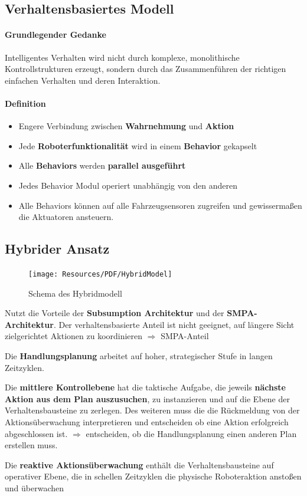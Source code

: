 \subsection{Verhaltensbasiertes Modell}
\paragraph{Grundlegender Gedanke} Intelligentes Verhalten wird nicht durch
komplexe, monolithische Kontrollstrukturen erzeugt, sondern durch das
Zusammenführen der richtigen einfachen Verhalten und deren Interaktion.

\paragraph{Definition}
\begin{itemize}
	\item Engere Verbindung zwischen \textbf{Wahrnehmung} und \textbf{Aktion}
	\item Jede \textbf{Roboterfunktionalität} wird in einem \textbf{Behavior}
		gekapselt
	\item Alle \textbf{Behaviors} werden \textbf{parallel ausgeführt}
	\item Jedes Behavior Modul operiert unabhängig von den anderen
	\item Alle Behaviors können auf alle Fahrzeugsensoren zugreifen und
		gewissermaßen die Aktuatoren ansteuern.
\end{itemize}

\subsection{Hybrider Ansatz}
{
\begin{figure}
	\texttt{[image: Resources/PDF/HybridModel]}
	\caption{Schema des Hybridmodell}
\end{figure}

Nutzt die Vorteile der \textbf{Subsumption Architektur} und der \textbf{SMPA-
Architektur}. Der verhaltensbasierte Anteil ist nicht geeignet, auf längere
Sicht zielgerichtet Aktionen zu koordinieren $\Rightarrow$ SMPA-Anteil

Die \textbf{Handlungsplanung} arbeitet auf hoher, strategischer Stufe
in langen Zeitzyklen.

Die \textbf{mittlere Kontrollebene} hat die taktische Aufga\-be, die jeweils
\textbf{nächste Aktion aus dem Plan aus\-zusuchen}, zu instanzieren und auf die
Ebene der Verhaltensbausteine zu zerlegen. Des weiteren muss die die
Rückmeldung von der Aktionsüberwachung interpretieren und entscheiden ob eine
Aktion erfolgreich abgeschlossen ist. $\Rightarrow$ entscheiden, ob die
Handlungsplanung einen anderen Plan erstellen muss.

Die \textbf{reaktive Aktionsüberwachung} enthält die Verhaltensbausteine auf
operativer Ebene, die in schellen Zeitzyklen die physische Roboteraktion
anstoßen und überwachen

}


